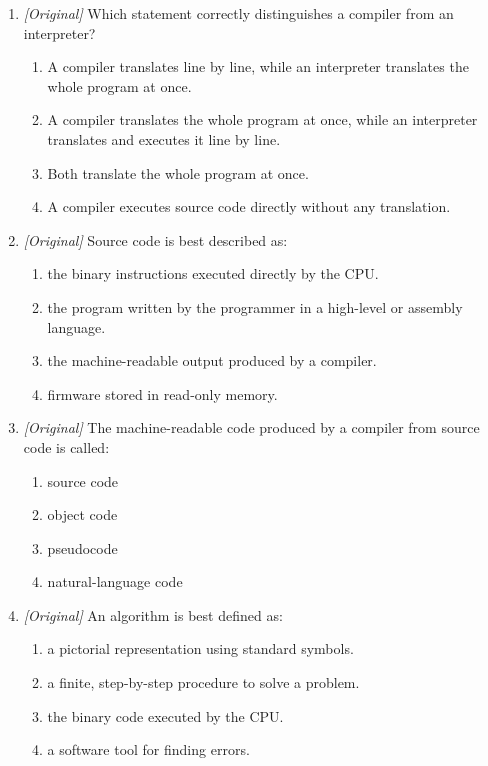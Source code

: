 \begin{enumerate}[label=\textbf{Q\arabic*.}, leftmargin=*]
\begin{enumerate}[label=\Alph*.]
  \end{enumerate}
\item \textit{[Original]} Which statement correctly distinguishes a compiler
  from an interpreter?
  \begin{enumerate}[label=\Alph*.]
    \item A compiler translates line by line, while an interpreter translates
      the whole program at once.
    \item A compiler translates the whole program at once, while an
      interpreter translates and executes it line by line.
    \item Both translate the whole program at once.
    \item A compiler executes source code directly without any translation.
  \end{enumerate}
\item \textit{[Original]} Source code is best described as:
  \begin{enumerate}[label=\Alph*.]
    \item the binary instructions executed directly by the CPU.
    \item the program written by the programmer in a high-level or assembly
      language.
    \item the machine-readable output produced by a compiler.
    \item firmware stored in read-only memory.
  \end{enumerate}
\item \textit{[Original]} The machine-readable code produced by a compiler
  from source code is called:
  \begin{enumerate}[label=\Alph*.]
    \item source code
    \item object code
    \item pseudocode
    \item natural-language code
  \end{enumerate}
\item \textit{[Original]} An algorithm is best defined as:
  \begin{enumerate}[label=\Alph*.]
    \item a pictorial representation using standard symbols.
    \item a finite, step-by-step procedure to solve a problem.
    \item the binary code executed by the CPU.
    \item a software tool for finding errors.

\end{enumerate}
\end{enumerate}
